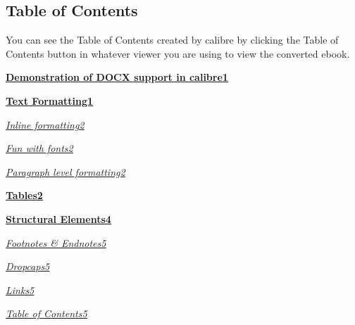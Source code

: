 \documentclass[11pt]{article}
\begin{document}
\subsection[{Table of Contents}]{\protect\textcolor{hex4F81BD}{Table of Contents}}\label{_Toc64145348}\label{table-of-contents}

You can see the Table of Contents created by calibre by clicking the Table of Contents button in whatever viewer you are using to view the converted ebook.

\hyperref[_Toc581531977]{\textcolor{hex0000FF}{\uline{\textbf{{\fontsize{10pt}{12pt}\selectfont Demonstration of DOCX support in calibre1}}}}}

\hyperref[_Toc2054249818]{\textcolor{hex0000FF}{\uline{\textbf{{\fontsize{10pt}{12pt}\selectfont Text Formatting1}}}}}

{\leftskip=12pt \hyperref[_Toc2137712100]{\textcolor{hex0000FF}{\uline{\textit{{\fontsize{10pt}{12pt}\selectfont Inline formatting2}}}}}\par}

{\leftskip=12pt \hyperref[_Toc1074133965]{\textcolor{hex0000FF}{\uline{\textit{{\fontsize{10pt}{12pt}\selectfont Fun with fonts2}}}}}\par}

{\leftskip=12pt \hyperref[_Toc2022725662]{\textcolor{hex0000FF}{\uline{\textit{{\fontsize{10pt}{12pt}\selectfont Paragraph level formatting2}}}}}\par}

\hyperref[_Toc28114276]{\textcolor{hex0000FF}{\uline{\textbf{{\fontsize{10pt}{12pt}\selectfont Tables2}}}}}

\hyperref[_Toc54889875]{\textcolor{hex0000FF}{\uline{\textbf{{\fontsize{10pt}{12pt}\selectfont Structural Elements4}}}}}

{\leftskip=12pt \hyperref[_Toc201580556]{\textcolor{hex0000FF}{\uline{\textit{{\fontsize{10pt}{12pt}\selectfont Footnotes \& Endnotes5}}}}}\par}

{\leftskip=12pt \hyperref[_Toc1977424358]{\textcolor{hex0000FF}{\uline{\textit{{\fontsize{10pt}{12pt}\selectfont Dropcaps5}}}}}\par}

{\leftskip=12pt \hyperref[_Toc1233048813]{\textcolor{hex0000FF}{\uline{\textit{{\fontsize{10pt}{12pt}\selectfont Links5}}}}}\par}

{\leftskip=12pt \hyperref[_Toc64145348]{\textcolor{hex0000FF}{\uline{\textit{{\fontsize{10pt}{12pt}\selectfont Table of Contents5}}}}}\par}
\end{document}
